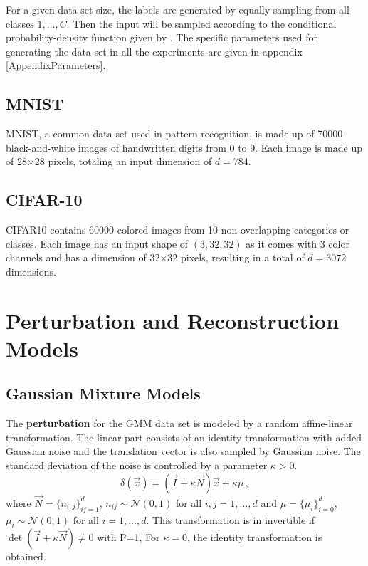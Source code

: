 For a given data set size, the labels are generated by equally sampling from all classes $1, \ldots, C$.
Then the input will be sampled according to the conditional probability-density function given by .
The specific parameters used for generating the data set in all the experiments
are given in appendix \ref{AppendixParameters}.


\subsection{MNIST}
MNIST, a common data set used in pattern recognition, is made up of 70000 black-and-white images 
of handwritten digits from 0 to 9. 
Each image is made up of 28$\times$28 pixels, totaling an input dimension of $d=784$.

\subsection{CIFAR-10}
CIFAR10 contains 60000 colored images from 10 non-overlapping categories or classes.
Each image has an input shape of $(3, 32, 32)$ as it comes with 3 color channels 
and has a dimension of 32$\times$32 pixels, resulting in a total of $d=3072$ dimensions.





\section{Perturbation and Reconstruction Models}
\label{sec:reconstruction_models}


\subsection{Gaussian Mixture Models}

The \textbf{perturbation} for the GMM data set is modeled by
a random affine-linear transformation.
The linear part consists of an identity transformation with added Gaussian noise
and the translation vector is also sampled by Gaussian noise.
The standard deviation of the noise is controlled by a parameter $\kappa > 0$.
\[
    \delta(\vec x) = (\vec I + \kappa \vec N)\vec x + \kappa \mu \,,
\]
where $\vec N = \{n_{i, j}\}_{i j = 1}^{d}$, $n_{ij} \sim \mathcal N (0, 1)$ for all $i, j = 1 , \ldots, d$
and 
$\mu = \{\mu_i\}_{i=0}^d$, $\mu_i \sim \mathcal N(0, 1)$ for all $i=1,\ldots,d$.
This transformation is in invertible if $\det (\vec I + \kappa \vec N) \neq 0$ with P=1,
For $\kappa = 0$, the identity transformation is obtained.

